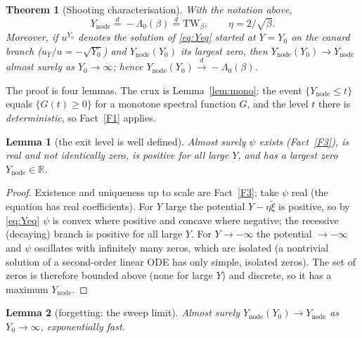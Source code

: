 \documentclass[11pt]{article}
\newtheorem{theorem}{Theorem}
\newtheorem{lemma}{Lemma}
\theoremstyle{definition}
\theoremstyle{remark}
\newcommand{\Ynode}{Y_{\mathrm{node}}}
\newcommand{\TW}{\mathrm{TW}}
\newcommand{\R}{\mathbb{R}}
\newcommand{\eqd}{\stackrel{d}{=}}
\newcommand{\xit}{\widetilde{\xi}}
\begin{document}
\begin{theorem}[Shooting characterisation]\label{thm:main}
With the notation above,
\[
  \Ynode \eqd -\Lambda_0(\beta)\eqd \TW_\beta ,\qquad \eta=2/\sqrt\beta .
\]
Moreover, if $u^{Y_0}$ denotes the solution of \eqref{eq:Yeq} started at $Y=Y_0$ on the
canard branch ($u_Y/u=-\sqrt{Y_0}$) and $\Ynode(Y_0)$ its largest zero, then
$\Ynode(Y_0)\to\Ynode$ almost surely as $Y_0\to\infty$; hence
$\Ynode(Y_0)\xrightarrow{d}-\Lambda_0(\beta)$.
\end{theorem}

The proof is four lemmas. The crux is Lemma~\ref{lem:mono}: the event $\{\Ynode\le t\}$
equals $\{G(t)\ge0\}$ for a monotone spectral function $G$, and the level $t$ there is
\emph{deterministic}, so Fact~\ref{F1} applies.

\begin{lemma}[the exit level is well defined]\label{lem:exists}
Almost surely $\psi$ exists (Fact~\ref{F3}), is real and not identically zero, is
positive for all large $Y$, and has a largest zero $\Ynode\in\R$.
\end{lemma}

\begin{proof}
Existence and uniqueness up to scale are Fact~\ref{F3}; take $\psi$ real (the equation
has real coefficients). For $Y$ large the potential $Y-\eta\xit$ is positive, so by
\eqref{eq:Yeq} $\psi$ is convex where positive and concave where negative; the recessive
(decaying) branch is positive for all large $Y$. For $Y\to-\infty$ the potential
$\to-\infty$ and $\psi$ oscillates with infinitely many zeros, which are isolated (a
nontrivial solution of a second-order linear ODE has only simple, isolated zeros). The
set of zeros is therefore bounded above (none for large $Y$) and discrete, so it has a
maximum $\Ynode$.
\end{proof}

\begin{lemma}[forgetting: the sweep limit]\label{lem:forget}
Almost surely $\Ynode(Y_0)\to\Ynode$ as $Y_0\to\infty$, exponentially fast.
\end{lemma}
\end{document}
